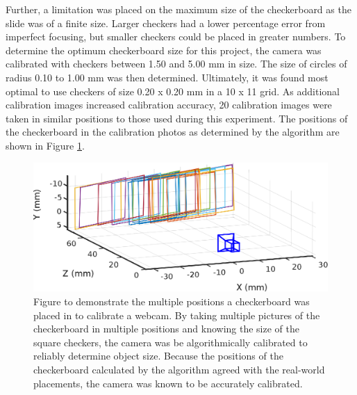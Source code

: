 \documentclass{physics_article_B}
\begin{document}
             Further, a limitation was placed on the maximum size of the checkerboard as the slide was of a finite size. Larger checkers had a lower percentage error from imperfect focusing, but smaller checkers could be placed in greater numbers. To determine the optimum checkerboard size for this project, the camera was calibrated with checkers between 1.50 and 5.00 mm in size. The size of circles of radius 0.10 to 1.00 mm was then determined. Ultimately, it was found most optimal to use checkers of size 0.20 x 0.20 mm in a 10 x 11 grid. As additional calibration images increased calibration accuracy, 20 calibration images were taken in similar positions to those used during this experiment. The positions of the checkerboard in the calibration photos as determined by the algorithm are shown in Figure \ref{fig:calib}. 
            
                \begin{figure}[H]
                    \centering\includegraphics[scale=0.86]{Figures/CameraExtrinsics.eps}
                    \caption{Figure to demonstrate the multiple positions a checkerboard was placed in to calibrate a webcam. By taking multiple pictures of the checkerboard in multiple positions and knowing the size of the square checkers, the camera was be algorithmically calibrated to reliably determine object size. Because the positions of the checkerboard calculated by the algorithm agreed with the real-world placements, the camera was known to be accurately calibrated.}\label{fig:calib}
                \end{figure}
            
\end{document}
